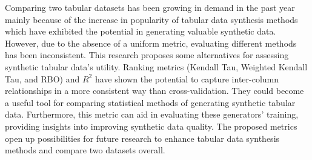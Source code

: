 Comparing two tabular datasets has been growing in demand in the past year mainly because of the increase in popularity of tabular data synthesis methods which have exhibited the potential in generating valuable synthetic data. However, due to the absence of a uniform metric, evaluating different methods has been inconsistent. This research proposes some alternatives for assessing synthetic tabular data's utility. Ranking metrics (Kendall Tau, Weighted Kendall Tau, and RBO) and $R^2$ have shown the potential to capture inter-column relationships in a more consistent way than cross-validation. They could become a useful tool for comparing statistical methods of generating synthetic tabular data. Furthermore, this metric can aid in evaluating these generators' training, providing insights into improving synthetic data quality. The proposed metrics open up possibilities for future research to enhance tabular data synthesis methods and compare two datasets overall.